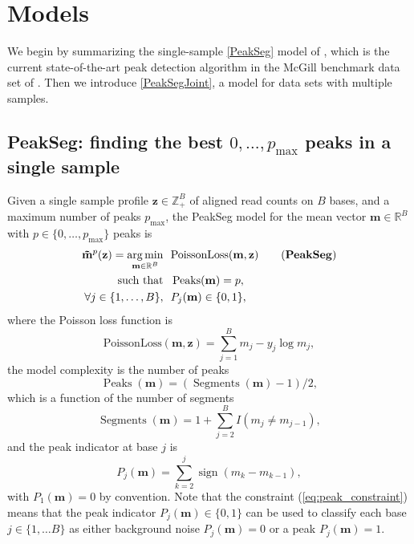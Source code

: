 \documentclass{article} %
\DeclareMathOperator*{\argmin}{arg\,min}
\DeclareMathOperator*{\Peaks}{Peaks}
\DeclareMathOperator*{\Segments}{Segments}
\newcommand{\sign}{\operatorname{sign}}
\newcommand{\RR}{\mathbb R}
\newcommand{\ZZ}{\mathbb Z}
\begin{document}
\section{Models}\label{sec:models}

We begin by summarizing the single-sample \ref{PeakSeg} model of
\citet{HOCKING-PeakSeg}, which is the current state-of-the-art peak
detection algorithm in the McGill benchmark data set of
\citet{hocking2014visual}. Then we introduce \ref{PeakSegJoint}, a
model for data sets with multiple samples.

\subsection{PeakSeg: finding the best $0,\dots,p_{\text{max}}$ peaks
  in a single sample}

Given a single sample profile $\mathbf z\in\ZZ_+^B$ of aligned read counts
on $B$ bases, and a maximum number of peaks $p_{\text{max}}$, the
PeakSeg model for the mean vector $\mathbf m\in\RR^B$ with $p\in\{0,
\dots, p_{\text{max}}\}$ peaks is
\begin{align}
  \label{PeakSeg}
  \mathbf{\tilde m}^p(\mathbf z)  =
    \argmin_{\mathbf m\in\RR^{B}} &\ \ 
    \text{PoissonLoss}(\mathbf m, \mathbf z) 
    \tag{\textbf{PeakSeg}}
\\
    \text{such that} &\ \  \Peaks(\mathbf m)=p,  \\
     \forall j\in\{1, \dots, B\}, &\ \ P_j(\mathbf m) \in\{0, 1\},
    \label{eq:peak_constraint}
\end{align}
where the Poisson loss function is
\begin{equation}\label{eq:rho}
  \text{PoissonLoss}(\mathbf m, \mathbf z)= \sum_{j=1}^B m_j - y_j \log m_j,
\end{equation} 
the model complexity is the number of peaks
\begin{equation}
  \Peaks(\mathbf m)=(\Segments(\mathbf m)-1)/2,
\end{equation}
which is a function of the number of segments
\begin{equation}
  \Segments(\mathbf m)=1+\sum_{j=2}^B I(m_j \neq m_{j-1}),
\end{equation}
and the peak indicator at base $j$ is
\begin{equation}
  \label{eq:peaks}
  P_j(\mathbf m) = \sum_{k=2}^j \sign( m_{k} - m_{k-1} ),
\end{equation}
with $P_1(\mathbf m)=0$ by convention. Note that the constraint
(\ref{eq:peak_constraint}) means that the peak indicator $P_j(\mathbf
m)\in\{0, 1\}$ can be used to classify each base $j\in\{1,\dots B\}$
as either background noise $P_j(\mathbf m)=0$ or a peak $P_j(\mathbf
m)=1$.
\end{document}
